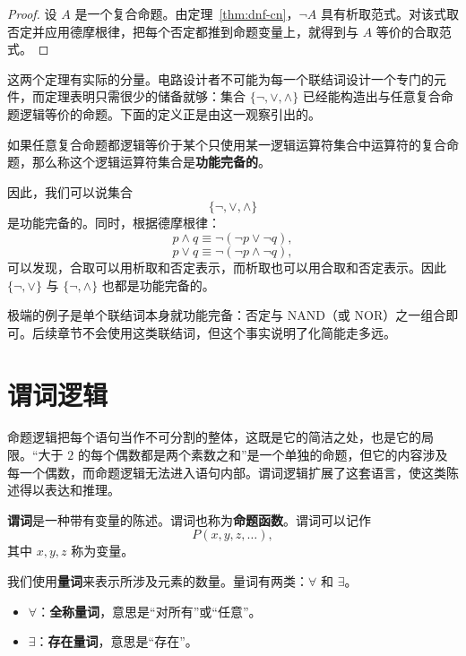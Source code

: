 \begin{proof}
设 $A$ 是一个复合命题。由定理~\ref{thm:dnf-cn}，$\neg A$ 具有析取范式。对该式取否定并应用德摩根律，把每个否定都推到命题变量上，就得到与 $A$ 等价的合取范式。
\end{proof}

这两个定理有实际的分量。电路设计者不可能为每一个联结词设计一个专门的元件，而定理表明只需很少的储备就够：集合 $\{\neg,\vee,\wedge\}$ 已经能构造出与任意复合命题逻辑等价的命题。下面的定义正是由这一观察引出的。

\begin{definition}[功能完备]
如果任意复合命题都逻辑等价于某个只使用某一逻辑运算符集合中运算符的复合命题，那么称这个逻辑运算符集合是\textbf{功能完备的}。
\end{definition}

因此，我们可以说集合
\[
\{\neg,\vee,\wedge\}
\]
是功能完备的。同时，根据德摩根律：
\[
p\wedge q\equiv\neg(\neg p\vee\neg q),
\]
\[
p\vee q\equiv\neg(\neg p\wedge\neg q),
\]
可以发现，合取可以用析取和否定表示，而析取也可以用合取和否定表示。因此 $\{\neg,\vee\}$ 与 $\{\neg,\wedge\}$ 也都是功能完备的。

\begin{note}
极端的例子是单个联结词本身就功能完备：否定与 NAND（或 NOR）之一组合即可。后续章节不会使用这类联结词，但这个事实说明了化简能走多远。
\end{note}

\section{谓词逻辑}

命题逻辑把每个语句当作不可分割的整体，这既是它的简洁之处，也是它的局限。“大于 $2$ 的每个偶数都是两个素数之和”是一个单独的命题，但它的内容涉及每一个偶数，而命题逻辑无法进入语句内部。谓词逻辑扩展了这套语言，使这类陈述得以表达和推理。

\begin{definition}[谓词]
\textbf{谓词}是一种带有变量的陈述。谓词也称为\textbf{命题函数}。谓词可以记作
\[
P(x,y,z,\dots),
\]
其中 $x,y,z$ 称为变量。
\end{definition}

\begin{definition}[量词]
我们使用\textbf{量词}来表示所涉及元素的数量。量词有两类：$\forall$ 和 $\exists$。
\begin{itemize}
    \item $\forall$：\textbf{全称量词}，意思是“对所有”或“任意”。
    \item $\exists$：\textbf{存在量词}，意思是“存在”。
\end{itemize}
\end{definition}

